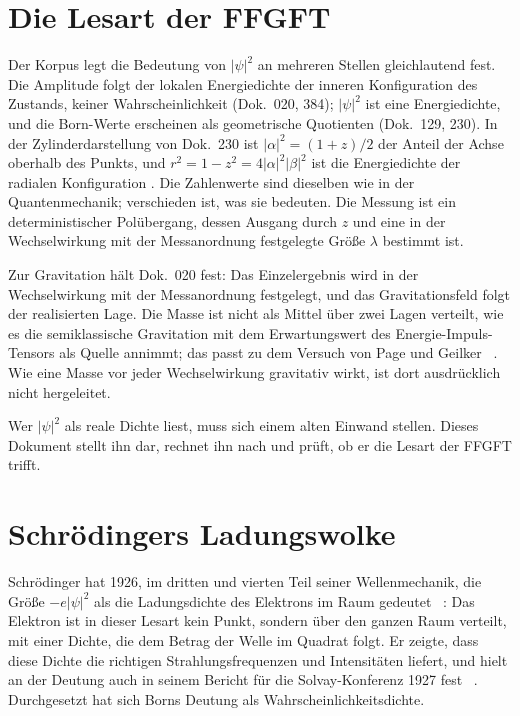\section{Die Lesart der FFGFT}

Der Korpus legt die Bedeutung von $|\psi|^2$ an mehreren Stellen gleichlautend fest. Die Amplitude
folgt der lokalen Energiedichte der inneren Konfiguration des Zustands, keiner Wahrscheinlichkeit
(Dok.~020, 384); $|\psi|^2$ ist eine Energiedichte, und die Born-Werte erscheinen als geometrische
Quotienten (Dok.~129, 230). In der Zylinderdarstellung von Dok.~230 ist $|\alpha|^2=(1+z)/2$ der
Anteil der Achse oberhalb des Punkts, und $r^2=1-z^2=4|\alpha|^2|\beta|^2$ ist die Energiedichte der
radialen Konfiguration \BM. Die Zahlenwerte sind dieselben wie in der Quantenmechanik; verschieden
ist, was sie bedeuten. Die Messung ist ein deterministischer Polübergang, dessen Ausgang durch $z$ und
eine in der Wechselwirkung mit der Messanordnung festgelegte Größe $\lambda$ bestimmt ist.

Zur Gravitation hält Dok.~020 fest: Das Einzelergebnis wird in der Wechselwirkung mit der
Messanordnung festgelegt, und das Gravitationsfeld folgt der realisierten Lage. Die Masse ist nicht
als Mittel über zwei Lagen verteilt, wie es die semiklassische Gravitation mit dem Erwartungswert
des Energie-Impuls-Tensors als Quelle annimmt; das passt zu dem Versuch von Page und Geilker
\QM~\cite{PageGeilker1981}. Wie eine Masse vor jeder Wechselwirkung gravitativ wirkt, ist dort
ausdrücklich nicht hergeleitet.

Wer $|\psi|^2$ als reale Dichte liest, muss sich einem alten Einwand stellen. Dieses Dokument stellt
ihn dar, rechnet ihn nach und prüft, ob er die Lesart der FFGFT trifft.

\section{Schrödingers Ladungswolke}

Schrödinger hat 1926, im dritten und vierten Teil seiner Wellenmechanik, die Größe $-e|\psi|^2$ als
die Ladungsdichte des Elektrons im Raum gedeutet \QM~\cite{Schroedinger1926}: Das Elektron ist in
dieser Lesart kein Punkt, sondern über den ganzen Raum verteilt, mit einer Dichte, die dem Betrag
der Welle im Quadrat folgt. Er zeigte, dass diese Dichte die richtigen Strahlungsfrequenzen und
Intensitäten liefert, und hielt an der Deutung auch in seinem Bericht für die Solvay-Konferenz 1927
fest \QM~\cite{BacciagaluppiValentini2009}. Durchgesetzt hat sich Borns Deutung als
Wahrscheinlichkeitsdichte.

